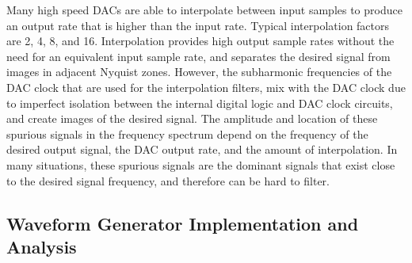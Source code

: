 \documentclass[12pt,letterpaper]{article}
\begin{document}
Many high speed DACs are able to interpolate between input samples to
produce an output rate that is higher than the input rate. Typical
interpolation factors are 2, 4, 8, and 16. Interpolation provides high
output sample rates without the need for an equivalent input sample
rate, and separates the desired signal from images in adjacent Nyquist
zones. However, the subharmonic frequencies of the DAC clock that are
used for the interpolation filters, mix with the DAC clock due to
imperfect isolation between the internal digital logic and DAC clock
circuits, and create images of the desired signal. The amplitude and
location of these spurious signals in the frequency spectrum depend on
the frequency of the desired output signal, the DAC output rate, and
the amount of interpolation. In many situations, these spurious
signals are the dominant signals that exist close to the desired
signal frequency, and therefore can be hard to filter.

\subsection{Waveform Generator Implementation and Analysis}
\label{sec:dac_analysis}
\end{document}
